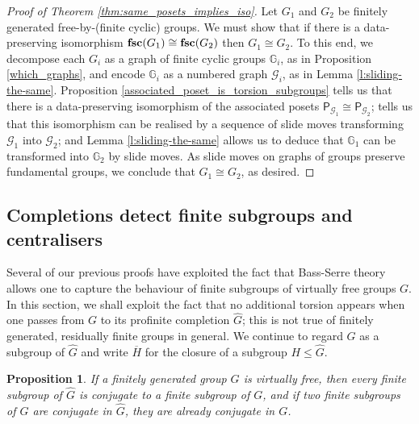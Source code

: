 \documentclass[11pt, a4 paper]{amsart}
\numberwithin{equation}{section}
\newtheorem{proposition}[theorem]{Proposition}
\theoremstyle{remark}
\theoremstyle{definition}
\def\wh{\widehat}
\def\tsc{{\rm{\bf{fsc}}}}
\def\GG{\mathbb{G}}
\def\mc{\mathcal}
\begin{document}
\begin{proof}
[Proof of Theorem \ref{thm:same_posets_implies_iso}]
	Let $G_1$ and $G_2$ be finitely generated free-by-(finite cyclic) groups. We must show that
	if there is a data-preserving isomorphism $\tsc(G_1)\cong\tsc(G_2)$ then  $G_1\cong G_2$. 
	To this end, we decompose each $G_i$ as a graph of finite cyclic groups $\GG_i$, as in Proposition \ref{which_graphs},
	and  encode $\GG_i$ as a numbered graph $\mc{G}_i$, as in Lemma \ref{l:sliding-the-same}.
	Proposition \ref{associated_poset_is_torsion_subgroups}
	tells us that there is a data-preserving isomorphism of the associated posets $\mathsf{P}_{\mathcal{G}_1} \cong 
	\mathsf{P}_{\mathcal{G}_2}$;   tells us that this isomorphism can be
	realised by a sequence of slide moves transforming  $\mathcal{G}_1$  into $\mathcal{G}_2$; and Lemma \ref{l:sliding-the-same}
	allows us to deduce that $\GG_1$ can be transformed into $\GG_2$ by slide moves. As slide moves on graphs of
	groups preserve fundamental groups, we conclude that $G_1\cong G_2$, as desired. 
\end{proof}  

\subsection{Completions detect finite subgroups and centralisers}
\label{sec:completions_detect}

Several of our previous proofs have exploited the fact that Bass-Serre theory allows one to capture the
behaviour of finite subgroups of virtually free groups $G$. In this section, we shall exploit the fact that no additional
torsion appears when one passes from $G$ to  its profinite completion $\wh{G}$; this is not true of finitely generated, residually finite groups in general. We continue to regard $G$ as a subgroup of $\wh{G}$ and write $\overline{H}$ for the closure of a
subgroup $H \leq \wh{G}$.

\begin{proposition}
\label{torsion}
	If a finitely generated group $G$ is virtually free, 
	then every finite subgroup of $\widehat G$ is conjugate to a finite subgroup of $G$,
	and if two finite subgroups of $G$ are conjugate in $\widehat G$, they are already conjugate in $G$.
\end{proposition}
\end{document}
